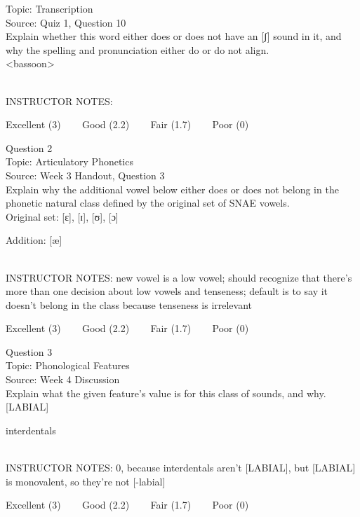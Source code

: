 \documentclass[12pt]{article}
\begin{document}
Topic: Transcription\\
Source: Quiz 1, Question 10\\

Explain whether this word either does or does not have an [ʃ] sound in it, and why the spelling and pronunciation either do or do not align.\\

<bassoon>


~\\
INSTRUCTOR NOTES: 


\vfill
Excellent (3) ~~~ Good (2.2) ~~~ Fair (1.7) ~~~ Poor (0)
\newpage

{\large Question 2}\\

Topic: Articulatory Phonetics\\
Source: Week 3 Handout, Question 3\\

Explain why the additional vowel below either does or does not belong in the phonetic natural class defined by the original set of SNAE vowels.\\

Original set: {[ɛ]}, {[ɪ]}, {[ʊ]}, {[ɔ]}

Addition: {[æ]}


~\\
INSTRUCTOR NOTES: new vowel is a low vowel; should recognize that there's more than one decision about low vowels and tenseness; default is to say it doesn't belong in the class because tenseness is irrelevant


\vfill
Excellent (3) ~~~ Good (2.2) ~~~ Fair (1.7) ~~~ Poor (0)
\newpage

{\large Question 3}\\

Topic: Phonological Features\\
Source: Week 4 Discussion\\

Explain what the given feature’s value is for this class of sounds, and why.\\

{[LABIAL]}

interdentals


~\\
INSTRUCTOR NOTES: 0, because interdentals aren't [LABIAL], but [LABIAL] is monovalent, so they're not [-labial]


\vfill
Excellent (3) ~~~ Good (2.2) ~~~ Fair (1.7) ~~~ Poor (0)
\newpage
\end{document}

